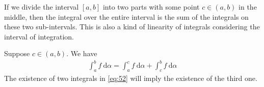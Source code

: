 \documentclass[thmcnt=section, 12pt]{elegantbook}
\begin{document}

\par If we divide the interval $[a, b]$ into two parts with some point $c \in (a, b)$ in the middle, then the integral over the entire interval is the sum of the integrals on these two sub-intervals. This is also a kind of linearity of integrals considering the interval of integration. 

\begin{lemma}
    Suppose $c \in (a, b)$. We have 
    \begin{align}
        \int_a^b f \ \mathrm{d}\alpha
        = \int_a^c f \ \mathrm{d}\alpha
        + \int_c^b f \ \mathrm{d}\alpha
        \label{eq:52}
    \end{align}
    The existence of two integrals in \eqref{eq:52} will imply the existence of the third one.
\end{lemma}
\end{document}
